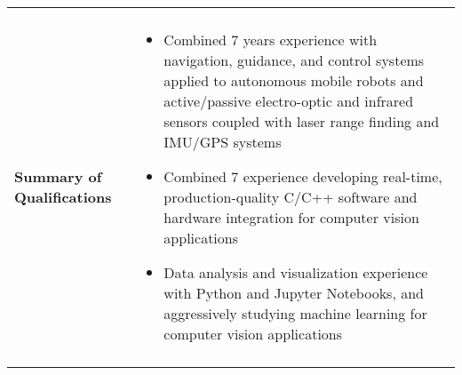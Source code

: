 \begin{tabular}{L{\lcolw}  L{\rcolw}}
 \hline \hline \\
\textbf{\Large Summary of Qualifications} &
\vspace{-0.3in} 
    \begin{itemize}[leftmargin = \itemmargin]

	\item Combined 7 years experience with navigation, guidance, and control systems applied to autonomous mobile robots and active/passive electro-optic and infrared sensors coupled with laser range finding and IMU/GPS systems
	
	\item Combined 7 experience developing real-time, production-quality C/C++ software and hardware integration for computer vision applications

	\item Data analysis and visualization experience with Python and Jupyter Notebooks, and aggressively studying machine learning for computer vision applications
	
	\end{itemize}\\
 \hline \\ 
\end{tabular}